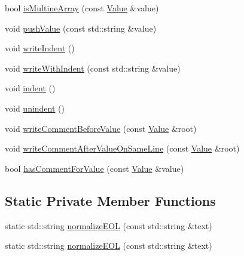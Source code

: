 \begin{DoxyCompactItemize}
\item 
bool \hyperlink{classJson_1_1StyledWriter_aa5dc671edf10b9976f1511da2271ab9d}{is\-Multine\-Array} (const \hyperlink{classJson_1_1Value}{Value} \&value)
\item 
void \hyperlink{classJson_1_1StyledWriter_aba120a1ff1b84411b32039188e8fb49f}{push\-Value} (const std\-::string \&value)
\item 
void \hyperlink{classJson_1_1StyledWriter_a885f4bfb5701896d60eee6716d2db7e4}{write\-Indent} ()
\item 
void \hyperlink{classJson_1_1StyledWriter_a7b3cc9da3cb455ee9b2752307ac21b58}{write\-With\-Indent} (const std\-::string \&value)
\item 
void \hyperlink{classJson_1_1StyledWriter_a0b65be6186a7c6638270990265e42b97}{indent} ()
\item 
void \hyperlink{classJson_1_1StyledWriter_acee1c9285519b573cfcb00b7e7f5a809}{unindent} ()
\item 
void \hyperlink{classJson_1_1StyledWriter_ad3452c48fabf968bf3693549331ec06e}{write\-Comment\-Before\-Value} (const \hyperlink{classJson_1_1Value}{Value} \&root)
\item 
void \hyperlink{classJson_1_1StyledWriter_ab12b274c62822fc51ec4617c6be95139}{write\-Comment\-After\-Value\-On\-Same\-Line} (const \hyperlink{classJson_1_1Value}{Value} \&root)
\item 
bool \hyperlink{classJson_1_1StyledWriter_a37a806d010f708cb68556f2666f79bdf}{has\-Comment\-For\-Value} (const \hyperlink{classJson_1_1Value}{Value} \&value)
\end{DoxyCompactItemize}
\subsection*{Static Private Member Functions}
\begin{DoxyCompactItemize}
\item 
static std\-::string \hyperlink{classJson_1_1StyledWriter_ad9444449eecf1581f7d227a0b50ecc4d}{normalize\-E\-O\-L} (const std\-::string \&text)
\item 
static std\-::string \hyperlink{classJson_1_1StyledWriter_ad9444449eecf1581f7d227a0b50ecc4d}{normalize\-E\-O\-L} (const std\-::string \&text)
\end{DoxyCompactItemize}
